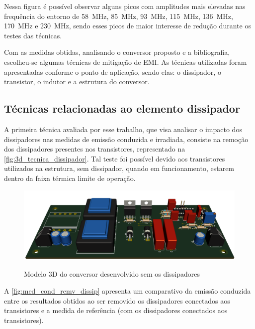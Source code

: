     Nessa figura é possível observar alguns picos com amplitudes mais elevadas nas frequência do entorno de \qty{58}{\mega\hertz}, \qty{85}{\mega\hertz}, \qty{93}{\mega\hertz}, \qty{115}{\mega\hertz}, \qty{136}{\mega\hertz}, \qty{170}{\mega\hertz} e \qty{230}{\mega\hertz}, sendo esses picos de maior interesse de redução durante os testes das técnicas.
    
    Com as medidas obtidas, analisando o conversor proposto e a bibliografia, escolheu-se algumas técnicas de mitigação de EMI. As técnicas utilizadas foram apresentadas conforme o ponto de aplicação, sendo elas: o dissipador, o transistor, o indutor e a estrutura do conversor. 
    
    \subsection{Técnicas relacionadas ao elemento dissipador} \label{cap:result_tecnicas_dissip}
    
    A primeira técnica avaliada por esse trabalho, que visa analisar o impacto dos dissipadores nas medidas de emissão conduzida e irradiada, consiste na remoção dos dissipadores presentes nos transistores, representado na \autoref{fig:3d_tecnica_dissipador}. Tal teste foi possível devido aos transistores utilizados na estrutura, sem dissipador, quando em funcionamento, estarem dentro da faixa térmica limite de operação. 
    
    \begin{figure}[H]
    	\centering
    	\caption{Modelo 3D do conversor desenvolvido sem os dissipadores}
    	\includegraphics[scale=.35]{pdf/fotos/tecnica_dissipador.png}
        \label{fig:3d_tecnica_dissipador}
    \end{figure}
    
    A \autoref{fig:med_cond_remv_dissip} apresenta um comparativo da emissão conduzida entre os resultados obtidos ao ser removido os dissipadores conectados aos transistores e a medida de referência (com os dissipadores conectados aos transistores). 
    
